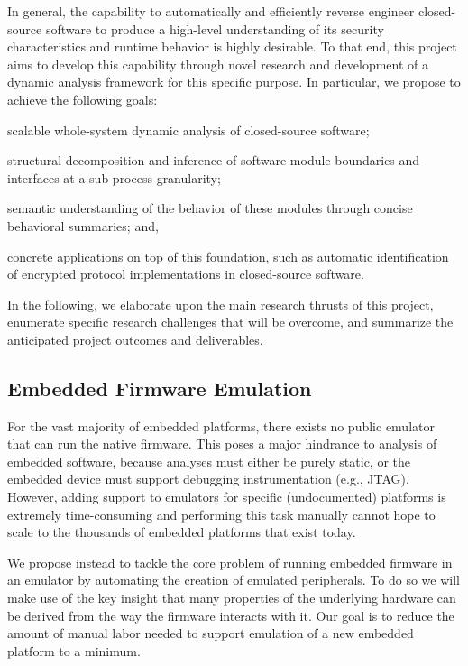 \documentclass[letterpaper,twoside,11pt,headings=small]{scrartcl}
\begin{document}
In general, the capability to automatically and efficiently reverse engineer
closed-source software to produce a high-level understanding of its security
characteristics and runtime behavior is highly desirable.  To that end, this
project aims to develop this capability through novel research and development
of a dynamic analysis framework for this specific purpose.  In particular, we
propose to achieve the following goals:%
\begin{inparaenum}
    \item scalable whole-system dynamic analysis of closed-source software;
    \item structural decomposition and inference of software module boundaries and interfaces at a sub-process granularity;
    \item semantic understanding of the behavior of these modules through concise behavioral summaries; and,
    \item concrete applications on top of this foundation, such as automatic identification of encrypted protocol implementations in closed-source software.
\end{inparaenum}

In the following, we elaborate upon the main research thrusts of this project,
enumerate specific research challenges that will be overcome, and summarize
the anticipated project outcomes and deliverables.


\subsection{Embedded Firmware Emulation}
\label{sec:overview:firmware}

For the vast majority of embedded platforms, there exists no public emulator
that can run the native firmware. This poses a major hindrance to analysis of
embedded software, because analyses must either be purely static, or the
embedded device must support debugging instrumentation (e.g., JTAG). However,
adding support to emulators for specific (undocumented) platforms is extremely
time-consuming and performing this task manually cannot hope to scale to the
thousands of embedded platforms that exist today.

We propose instead to tackle the core problem of running embedded firmware in
an emulator by automating the creation of emulated peripherals. To do so we
will make use of the key insight that many properties of the underlying
hardware can be derived from the way the firmware interacts with it. Our goal
is to reduce the amount of manual labor needed to support emulation of a new
embedded platform to a minimum.
\end{document}
